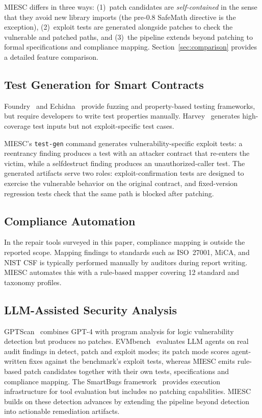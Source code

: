\documentclass[conference]{IEEEtran}
\begin{document}
MIESC differs in three ways: (1)~patch candidates are \emph{self-contained} in the sense that they avoid new library imports (the pre-0.8 SafeMath directive is the exception), (2)~exploit tests are generated alongside patches to check the vulnerable and patched paths, and (3)~the pipeline extends beyond patching to formal specifications and compliance mapping. Section~\ref{sec:comparison} provides a detailed feature comparison.

\subsection{Test Generation for Smart Contracts}

Foundry~\cite{foundry2025} and Echidna~\cite{grieco2020echidna} provide fuzzing and property-based testing frameworks, but require developers to write test properties manually. Harvey~\cite{harvey2020} generates high-coverage test inputs but not exploit-specific test cases.

MIESC's \texttt{test-gen} command generates vulnerability-specific exploit tests: a reentrancy finding produces a test with an attacker contract that re-enters the victim, while a selfdestruct finding produces an unauthorized-caller test. The generated artifacts serve two roles: exploit-confirmation tests are designed to exercise the vulnerable behavior on the original contract, and fixed-version regression tests check that the same path is blocked after patching.

\subsection{Compliance Automation}

In the repair tools surveyed in this paper, compliance mapping is outside the reported scope. Mapping findings to standards such as ISO~27001, MiCA, and NIST CSF is typically performed manually by auditors during report writing. MIESC automates this with a rule-based mapper covering 12 standard and taxonomy profiles.

\subsection{LLM-Assisted Security Analysis}

GPTScan~\cite{sun2024gptscan} combines GPT-4 with program analysis for logic vulnerability detection but produces no patches. EVMbench~\cite{evmbench2026} evaluates LLM agents on real audit findings in detect, patch and exploit modes; its patch mode scores agent-written fixes against the benchmark's exploit tests, whereas MIESC emits rule-based patch candidates together with their own tests, specifications and compliance mapping. The SmartBugs framework~\cite{smartbugs2023} provides execution infrastructure for tool evaluation but includes no patching capabilities. MIESC builds on these detection advances by extending the pipeline beyond detection into actionable remediation artifacts.
\end{document}
